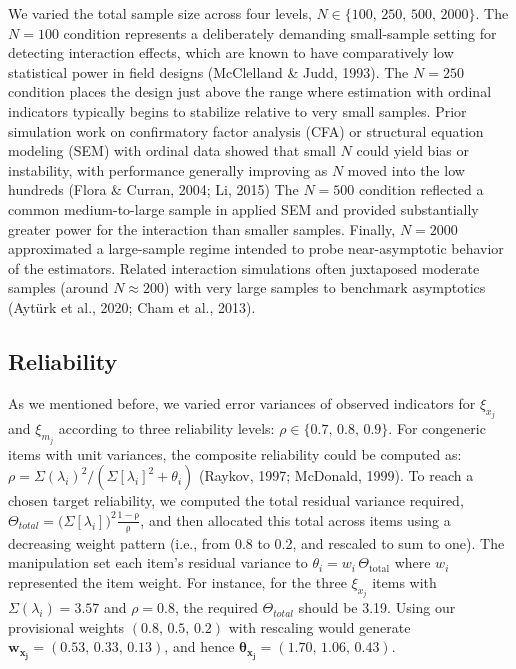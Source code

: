 \documentclass[
  man]{apa6}
\begin{document}
We varied the total sample size across four levels, \(N \in \{100,\,250,\,500,\,2000\}\). The \(N = 100\) condition represents a deliberately demanding small-sample setting for detecting interaction effects, which are known to have comparatively low statistical power in field designs (McClelland \& Judd, 1993). The \(N=250\) condition places the design just above the range where estimation with ordinal indicators typically begins to stabilize relative to very small samples. Prior simulation work on confirmatory factor analysis (CFA) or structural equation modeling (SEM) with ordinal data showed that small \(N\) could yield bias or instability, with performance generally improving as \(N\) moved into the low hundreds (Flora \& Curran, 2004; Li, 2015) The \(N=500\) condition reflected a common medium-to-large sample in applied SEM and provided substantially greater power for the interaction than smaller samples. Finally, \(N=2000\) approximated a large-sample regime intended to probe near-asymptotic behavior of the estimators. Related interaction simulations often juxtaposed moderate samples (around \(N\!\approx\!200\)) with very large samples to benchmark asymptotics (Aytürk et al., 2020; Cham et al., 2013).

\subsection{Reliability}\label{reliability}

As we mentioned before, we varied error variances of observed indicators for \(\xi_{x_{j}}\) and \(\xi_{m_{j}}\) according to three reliability levels: \(\rho \in \{0.7,\,0.8,\,0.9\}\). For congeneric items with unit variances, the composite reliability could be computed as: \(\rho = \Sigma(\lambda_{i})^2/(\Sigma[\lambda_{i}]^2 + \theta_{i})\) (Raykov, 1997; McDonald, 1999). To reach a chosen target reliability, we computed the total residual variance required, \(\Theta_{total} =\Big(\Sigma[\lambda_i]\Big)^2\frac{1-\mathrm{\rho}}{\mathrm{\rho}}\), and then allocated this total across items using a decreasing weight pattern (i.e., from 0.8 to 0.2, and rescaled to sum to one). The manipulation set each item's residual variance to \(\theta_i=w_i\,\Theta_{\text{total}}\) where \(w_{i}\) represented the item weight. For instance, for the three \(\xi_{x_j}\) items with \(\Sigma(\lambda_{i}) = 3.57\) and \(\rho = 0.8\), the required \(\Theta_{total}\) should be 3.19. Using our provisional weights \((0.8,\,0.5,\,0.2)\) with rescaling would generate \(\boldsymbol{w_{x_{j}}} = (0.53,\,0.33,\,0.13)\), and hence \(\boldsymbol{\theta_{x_{j}}} = (1.70,\,1.06,\,0.43)\).
\end{document}
